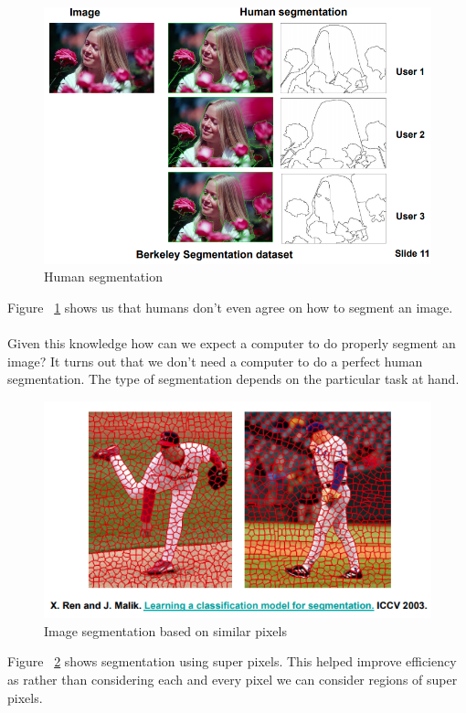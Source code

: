 \documentclass{article}
\begin{document}
\begin{figure}[htp]
    \centering
    \includegraphics[width=12cm]{slide_11_1}
    \caption{Human segmentation}
    \label{fig:Slide11_1}
\end{figure}

Figure ~\ref{fig:Slide11_1} shows us that humans don't even agree on how to segment an image.
\\\\
Given this knowledge how can we expect a computer to do properly segment an image? It turns out that we don't need a computer to do a perfect human segmentation. The type of segmentation depends on the particular task at hand.

\begin{figure}[htp]
    \centering
    \includegraphics[width=12cm]{slide_12_1}
    \caption{Image segmentation based on similar pixels}
    \label{fig:Slide12_1}
\end{figure}

\newpage
Figure ~\ref{fig:Slide12_1} shows segmentation using super pixels. This helped improve efficiency as rather than considering each and every pixel we can consider regions of super pixels.
\end{document}
